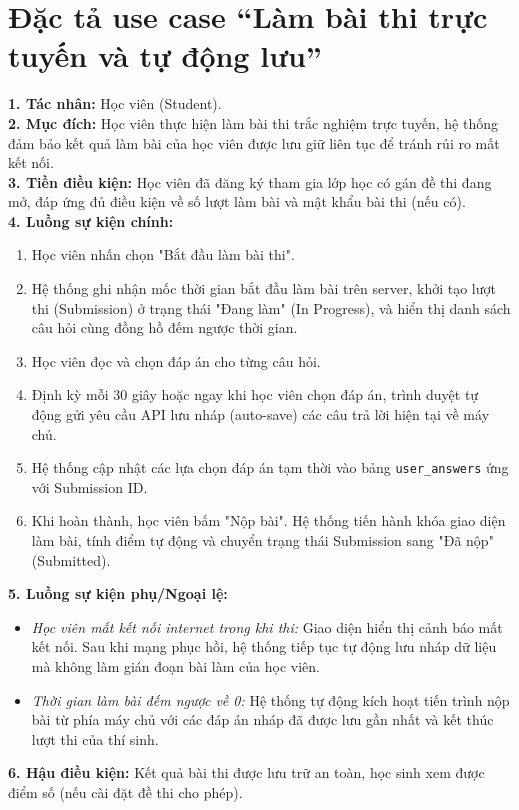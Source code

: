 \documentclass[../DoAn.tex]{subfiles}
\begin{document}
\section{Đặc tả use case ``Làm bài thi trực tuyến và tự động lưu''}
\label{appendix:B.2}

\textbf{1. Tác nhân:} Học viên (Student). \\
\textbf{2. Mục đích:} Học viên thực hiện làm bài thi trắc nghiệm trực tuyến, hệ thống đảm bảo kết quả làm bài của học viên được lưu giữ liên tục để tránh rủi ro mất kết nối. \\
\textbf{3. Tiền điều kiện:} Học viên đã đăng ký tham gia lớp học có gán đề thi đang mở, đáp ứng đủ điều kiện về số lượt làm bài và mật khẩu bài thi (nếu có). \\
\textbf{4. Luồng sự kiện chính:}
\begin{enumerate}
    \item Học viên nhấn chọn "Bắt đầu làm bài thi".
    \item Hệ thống ghi nhận mốc thời gian bắt đầu làm bài trên server, khởi tạo lượt thi (Submission) ở trạng thái "Đang làm" (In Progress), và hiển thị danh sách câu hỏi cùng đồng hồ đếm ngược thời gian.
    \item Học viên đọc và chọn đáp án cho từng câu hỏi.
    \item Định kỳ mỗi 30 giây hoặc ngay khi học viên chọn đáp án, trình duyệt tự động gửi yêu cầu API lưu nháp (auto-save) các câu trả lời hiện tại về máy chủ.
    \item Hệ thống cập nhật các lựa chọn đáp án tạm thời vào bảng \texttt{user\_answers} ứng với Submission ID.
    \item Khi hoàn thành, học viên bấm "Nộp bài". Hệ thống tiến hành khóa giao diện làm bài, tính điểm tự động và chuyển trạng thái Submission sang "Đã nộp" (Submitted).
\end{enumerate}
\textbf{5. Luồng sự kiện phụ/Ngoại lệ:}
\begin{itemize}
    \item \textit{Học viên mất kết nối internet trong khi thi:} Giao diện hiển thị cảnh báo mất kết nối. Sau khi mạng phục hồi, hệ thống tiếp tục tự động lưu nháp dữ liệu mà không làm gián đoạn bài làm của học viên.
    \item \textit{Thời gian làm bài đếm ngược về 0:} Hệ thống tự động kích hoạt tiến trình nộp bài từ phía máy chủ với các đáp án nháp đã được lưu gần nhất và kết thúc lượt thi của thí sinh.
\end{itemize}
\textbf{6. Hậu điều kiện:} Kết quả bài thi được lưu trữ an toàn, học sinh xem được điểm số (nếu cài đặt đề thi cho phép).
\end{document}
